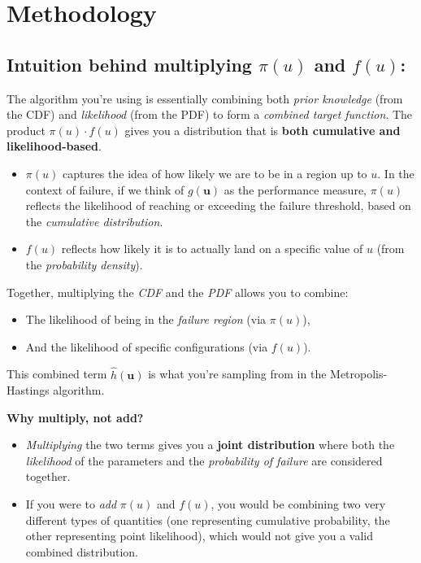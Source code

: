 \chapter{Methodology}
\label{ch:methodology}


\section*{Intuition behind multiplying $\pi(u)$ and $f(u)$:}

The algorithm you're using is essentially combining both \textit{prior knowledge} (from the CDF) and \textit{likelihood} (from the PDF) to form a \textit{combined target function}. The product $\pi(u) \cdot f(u)$ gives you a distribution that is \textbf{both cumulative and likelihood-based}.

\begin{itemize}
    \item \(\pi(u)\) captures the idea of how likely we are to be in a region up to \(u\). In the context of failure, if we think of \(g(\mathbf{u})\) as the performance measure, \(\pi(u)\) reflects the likelihood of reaching or exceeding the failure threshold, based on the \textit{cumulative distribution}.
    
    \item \(f(u)\) reflects how likely it is to actually land on a specific value of \(u\) (from the \textit{probability density}).
\end{itemize}

Together, multiplying the \textit{CDF} and the \textit{PDF} allows you to combine:
\begin{itemize}
    \item The likelihood of being in the \textit{failure region} (via \(\pi(u)\)),
    \item And the likelihood of specific configurations (via \(f(u)\)).
\end{itemize}

This combined term $\hat{h}(\mathbf{u})$ is what you're sampling from in the Metropolis-Hastings algorithm.

\textbf{Why multiply, not add?}
\begin{itemize}
    \item \textit{Multiplying} the two terms gives you a \textbf{joint distribution} where both the \textit{likelihood} of the parameters and the \textit{probability of failure} are considered together.
    \item If you were to \textit{add} $\pi(u)$ and $f(u)$, you would be combining two very different types of quantities (one representing cumulative probability, the other representing point likelihood), which would not give you a valid combined distribution.
\end{itemize}

